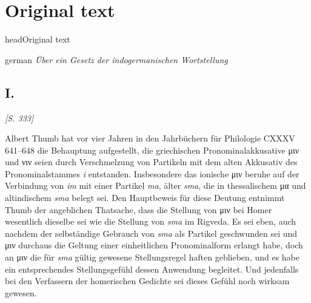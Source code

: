 \chapter{Original text}\label{original}

\le head{Original text}
\begin{otherlanguage*}{german}
\emph{\Large{Über ein Gesetz der indogermanischen Wortstellung}}

\section*{I.}

\hypertarget{p333}{\emph{[S. 333]}}\label{p333} Albert Thumb hat vor vier Jahren in den Jahrbüchern für Philologie CXXXV 641--648 die Behauptung aufgestellt, die griechischen Pronominalakkusative μιν und νιν seien durch Verschmelzung von Partikeln mit dem alten Akkusativ des Pronominalstammes \emph{i} entstanden. Insbesondere das ionische μιν beruhe auf der Verbindung von \emph{im} mit einer Partikel \emph{ma}, älter \textit{sma}, die in thessalischem μα und altindischem \textit{sma} belegt sei. Den Hauptbeweis für diese Deutung entnimmt Thumb der angeblichen Thatsache, dass die Stellung von μιν bei Homer wesentlich dieselbe sei wie die Stellung von \emph{sma} im Rigveda. Es sei eben, auch nachdem der selbständige Gebrauch von \emph{sma} als Partikel geschwunden sei und μιν durchaus die Geltung einer einheitlichen Pronominalform erlangt habe, doch an μιν die für \emph{sma} gültig gewesene Stellungsregel haften geblieben, und es habe ein entsprechendes Stellungsgefühl dessen Anwendung begleitet. Und jedenfalls bei den Verfassern der homerischen Gedichte sei dieses Gefühl noch wirksam gewesen.



\end{otherlanguage*}
